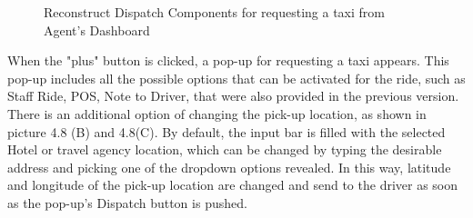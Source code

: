 \begin{figure}[H]
	\centering
	\qquad
	\caption{
		Reconstruct Dispatch Components for requesting a taxi from Agent's Dashboard
	}
	\label{fig:example}
\end{figure}

When the "plus" button is clicked, a pop-up for requesting a taxi appears. This pop-up includes all the possible options that can be activated for the ride, such as Staff Ride, POS, Note to Driver, that were also provided in the previous version. There is an additional option of changing the pick-up location, as shown in picture 4.8 (B) and 4.8(C). By default, the input bar is filled with the selected Hotel or travel agency location, which can be changed by typing the desirable address and picking one of the dropdown options revealed. In this way, latitude and longitude of the pick-up location are changed and send to the driver as soon as the pop-up's Dispatch button is pushed.

